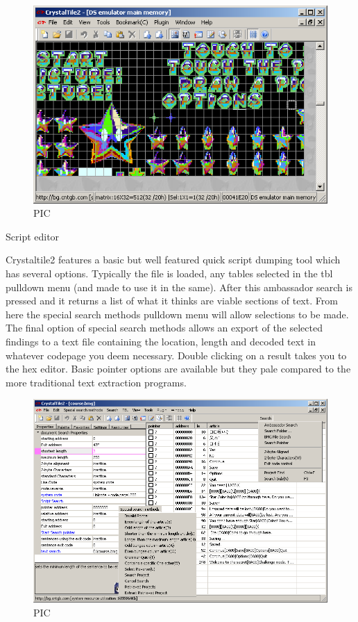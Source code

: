 \documentclass[
]{book}
\begin{document}
\begin{figure}
\centering
\includegraphics{images/227_home_fast6191_romhackingguide_unrenamed_fil___inal_borders_romhackguidecrystaltile2usage8.png}
\caption{PIC}
\end{figure}

Script editor

Crystaltile2 features a basic but well featured quick script dumping tool which has several options. Typically the file is loaded, any tables selected in the tbl pulldown menu (and made to use it in the same). After this ambassador search is pressed and it returns a list of what it thinks are viable sections of text. From here the special search methods pulldown menu will allow selections to be made. The final option of special search methods allows an export of the selected findings to a text file containing the location, length and decoded text in whatever codepage you deem necessary. Double clicking on a result takes you to the hex editor. Basic pointer options are available but they pale compared to the more traditional text extraction programs.

\begin{figure}
\centering
\includegraphics{images/228_home_fast6191_romhackingguide_unrenamed_fil___inal_borders_romhackguidecrystaltile2usage9.png}
\caption{PIC}
\end{figure}
\end{document}
